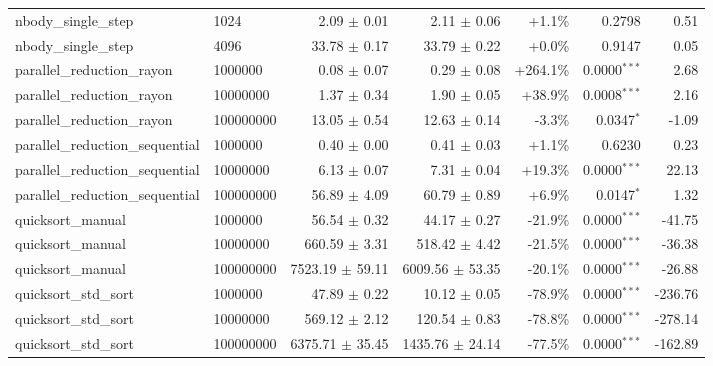 \begin{table}[htbp]
\begin{tabular}{llrrrrr}
nbody_single_step & 1024 & 2.09 $\pm$ 0.01 & 2.11 $\pm$ 0.06 & +1.1\% & 0.2798 & 0.51 \\
nbody_single_step & 4096 & 33.78 $\pm$ 0.17 & 33.79 $\pm$ 0.22 & +0.0\% & 0.9147 & 0.05 \\
parallel_reduction_rayon & 1000000 & 0.08 $\pm$ 0.07 & 0.29 $\pm$ 0.08 & +264.1\% & 0.0000$^{***}$ & 2.68 \\
parallel_reduction_rayon & 10000000 & 1.37 $\pm$ 0.34 & 1.90 $\pm$ 0.05 & +38.9\% & 0.0008$^{***}$ & 2.16 \\
parallel_reduction_rayon & 100000000 & 13.05 $\pm$ 0.54 & 12.63 $\pm$ 0.14 & -3.3\% & 0.0347$^{*}$ & -1.09 \\
parallel_reduction_sequential & 1000000 & 0.40 $\pm$ 0.00 & 0.41 $\pm$ 0.03 & +1.1\% & 0.6230 & 0.23 \\
parallel_reduction_sequential & 10000000 & 6.13 $\pm$ 0.07 & 7.31 $\pm$ 0.04 & +19.3\% & 0.0000$^{***}$ & 22.13 \\
parallel_reduction_sequential & 100000000 & 56.89 $\pm$ 4.09 & 60.79 $\pm$ 0.89 & +6.9\% & 0.0147$^{*}$ & 1.32 \\
quicksort_manual & 1000000 & 56.54 $\pm$ 0.32 & 44.17 $\pm$ 0.27 & -21.9\% & 0.0000$^{***}$ & -41.75 \\
quicksort_manual & 10000000 & 660.59 $\pm$ 3.31 & 518.42 $\pm$ 4.42 & -21.5\% & 0.0000$^{***}$ & -36.38 \\
quicksort_manual & 100000000 & 7523.19 $\pm$ 59.11 & 6009.56 $\pm$ 53.35 & -20.1\% & 0.0000$^{***}$ & -26.88 \\
quicksort_std_sort & 1000000 & 47.89 $\pm$ 0.22 & 10.12 $\pm$ 0.05 & -78.9\% & 0.0000$^{***}$ & -236.76 \\
quicksort_std_sort & 10000000 & 569.12 $\pm$ 2.12 & 120.54 $\pm$ 0.83 & -78.8\% & 0.0000$^{***}$ & -278.14 \\
quicksort_std_sort & 100000000 & 6375.71 $\pm$ 35.45 & 1435.76 $\pm$ 24.14 & -77.5\% & 0.0000$^{***}$ & -162.89 \\
\bottomrule
\end{tabular}
\end{table}
